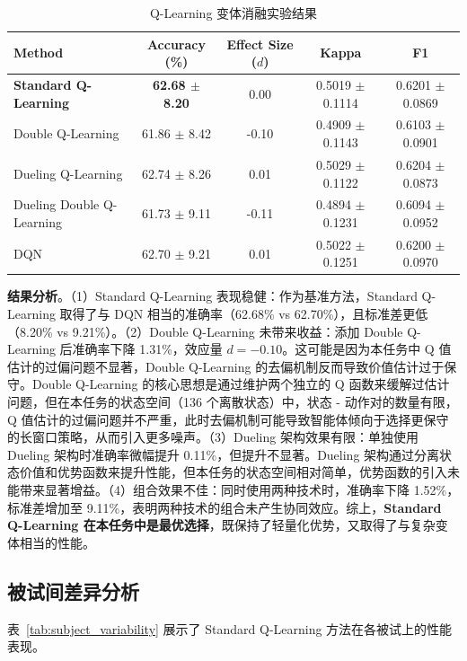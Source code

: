 \begin{table}[H]
\centering
\caption{Q-Learning 变体消融实验结果}
\label{tab:ablation}
\small
\begin{tabular}{lcccc}
\hline
\textbf{Method} & \textbf{Accuracy (\%)}  & \textbf{Effect Size ($d$)} & \textbf{Kappa} & \textbf{F1} \\
\hline
\textbf{Standard Q-Learning} & \textbf{62.68 $\pm$ 8.20} & 0.00 & 0.5019 $\pm$ 0.1114 & 0.6201 $\pm$ 0.0869 \\
Double Q-Learning & 61.86 $\pm$ 8.42  & -0.10 & 0.4909 $\pm$ 0.1143 & 0.6103 $\pm$ 0.0901 \\
Dueling Q-Learning & 62.74 $\pm$ 8.26  & 0.01 & 0.5029 $\pm$ 0.1122 & 0.6204 $\pm$ 0.0873 \\
Dueling Double Q-Learning & 61.73 $\pm$ 9.11  & -0.11 & 0.4894 $\pm$ 0.1231 & 0.6094 $\pm$ 0.0952 \\
DQN & 62.70 $\pm$ 9.21  & 0.01 & 0.5022 $\pm$ 0.1251 & 0.6200 $\pm$ 0.0970 \\
\hline
\end{tabular}
\end{table}

\textbf{结果分析}。（1）Standard Q-Learning 表现稳健：作为基准方法，Standard Q-Learning 取得了与 DQN 相当的准确率（62.68\% vs 62.70\%），且标准差更低（8.20\% vs 9.21\%）。（2）Double Q-Learning 未带来收益：添加 Double Q-Learning 后准确率下降 1.31\%，效应量 $d = -0.10$。这可能是因为本任务中 Q 值估计的过偏问题不显著，Double Q-Learning 的去偏机制反而导致价值估计过于保守。Double Q-Learning 的核心思想是通过维护两个独立的 Q 函数来缓解过估计问题\cite{van2016deep}，但在本任务的状态空间（136 个离散状态）中，状态 - 动作对的数量有限，Q 值估计的过偏问题并不严重，此时去偏机制可能导致智能体倾向于选择更保守的长窗口策略，从而引入更多噪声。（3）Dueling 架构效果有限：单独使用 Dueling 架构时准确率微幅提升 0.11\%，但提升不显著。Dueling 架构通过分离状态价值和优势函数来提升性能\cite{wang2016dueling}，但本任务的状态空间相对简单，优势函数的引入未能带来显著增益。（4）组合效果不佳：同时使用两种技术时，准确率下降 1.52\%，标准差增加至 9.11\%，表明两种技术的组合未产生协同效应。综上，\textbf{Standard Q-Learning 在本任务中是最优选择}，既保持了轻量化优势，又取得了与复杂变体相当的性能。

\subsection{被试间差异分析}
\label{subsec:subject_variability}

表~\ref{tab:subject_variability} 展示了 Standard Q-Learning 方法在各被试上的性能表现。

